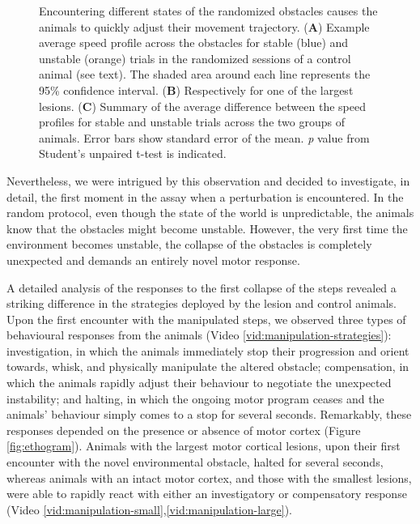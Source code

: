 \begin{figure}
\centering

\caption{Encountering different states of the randomized obstacles causes the animals to quickly adjust their movement trajectory. (\textbf{A}) Example average speed profile across the obstacles for stable (blue) and unstable (orange) trials in the randomized sessions of a control animal (see text). The shaded area around each line represents the 95\% confidence interval. (\textbf{B}) Respectively for one of the largest lesions. (\textbf{C}) Summary of the average difference between the speed profiles for stable and unstable trials across the two groups of animals. Error bars show standard error of the mean. \emph{p} value from Student's unpaired t-test is indicated.}
\label{fig:speed}
\end{figure}

Nevertheless, we were intrigued by this observation and decided to investigate, in detail, the first moment in the assay when a perturbation is encountered. In the random protocol, even though the state of the world is unpredictable, the animals know that the obstacles might become unstable. However, the very first time the environment becomes unstable, the collapse of the obstacles is completely unexpected and demands an entirely novel motor response.

A detailed analysis of the responses to the first collapse of the steps revealed a striking difference in the strategies deployed by the lesion and control animals. Upon the first encounter with the manipulated steps, we observed three types of behavioural responses from the animals (Video \ref{vid:manipulation-strategies}): investigation, in which the animals immediately stop their progression and orient towards, whisk, and physically manipulate the altered obstacle; compensation, in which the animals rapidly adjust their behaviour to negotiate the unexpected instability; and halting, in which the ongoing motor program ceases and the animals' behaviour simply comes to a stop for several seconds. Remarkably, these responses depended on the presence or absence of motor cortex (Figure \ref{fig:ethogram}). Animals with the largest motor cortical lesions, upon their first encounter with the novel environmental obstacle, halted for several seconds, whereas animals with an intact motor cortex, and those with the smallest lesions, were able to rapidly react with either an investigatory or compensatory response (Video \ref{vid:manipulation-small},\ref{vid:manipulation-large}).


